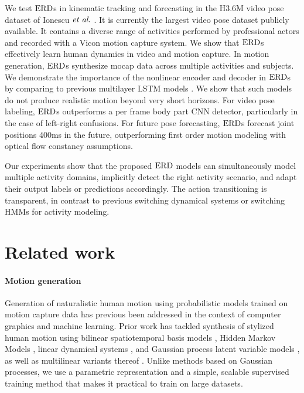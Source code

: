 \documentclass[10pt,twocolumn,letterpaper]{article}
\begin{document}
We test $\text{ERD}$s in kinematic tracking and forecasting in the H3.6M video pose dataset  of Ionescu $\text{\textit{et al.}}$ \cite{h36m_pami}. It is currently the largest video pose dataset publicly available. It contains a diverse range of activities performed by professional actors and recorded with a Vicon motion capture system. We show that $\text{ERD}$s effectively learn human dynamics in video and motion capture. In motion generation, $\text{ERD}$s 
synthesize mocap  data across multiple activities and subjects. 
We demonstrate the importance of the nonlinear encoder and decoder in $\text{ERD}$s by comparing to previous multilayer LSTM  models \cite{DBLP:journals/corr/Graves13}. We show that such models do not produce realistic motion beyond very short horizons. 
For video pose labeling,  $\text{ERD}$s outperforms a per frame body part CNN detector, particularly in the case of left-right confusions.  For future pose forecasting,  $\text{ERD}$s   forecast joint positions 400ms in the future, outperforming first order motion modeling with optical flow constancy assumptions. 

Our experiments show that the proposed $\text{ERD}$  models can simultaneously model multiple activity domains,  implicitly detect the right activity scenario, and adapt their output labels or predictions accordingly. The action transitioning is  transparent,  in contrast to previous switching dynamical systems or switching HMMs \cite{prm-lslmh-00,Fox:IEEESPM2010} for activity modeling. 









 



 \section{Related work} \label{sec:related}

\paragraph{Motion generation}







Generation of naturalistic human motion using probabilistic models trained on motion capture data has previous been addressed in the context of computer graphics and machine learning. Prior work has tackled synthesis of stylized human motion using bilinear spatiotemporal basis models \cite{Akhter:2012:BilinearBasis},  Hidden Markov Models \cite{bh-sm-00}, linear dynamical systems \cite{prm-lslmh-00},  and Gaussian process latent variable models \cite{wfh-gpdmh-08,ufgpd-tclvm-08},  as well as multilinear variants thereof \cite{hpp-sthm-05,wfh-mgpms-07}. Unlike methods based on Gaussian processes, we use a parametric representation and a simple, scalable supervised training method that makes it practical to train on large datasets.
\end{document}

